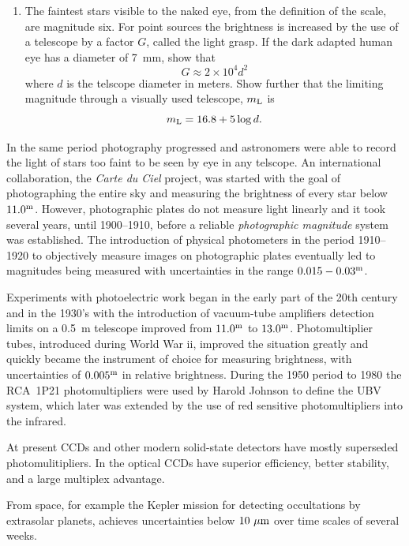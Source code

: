 \begin{enumerate}
\item The faintest stars visible to the naked eye, from the definition
  of the scale, are magnitude six. For point sources the brightness is
  increased by the use of a telescope by a factor $G$, called the
  light grasp. If the dark adapted human eye has a diameter of 7~mm,
  show that 
\[
G\approx 2\times10^4 d^2
\]
where $d$ is the telscope diameter in meters. Show further that the
limiting magnitude through a visually used telescope, $m_{\rm L}$ is 
\[
m_{\rm L}=16.8+5\log d.
\]
\setcounter{count}{\value{enumi}} 
\end{enumerate}

In the same period photography progressed and astronomers were able to
record the light of stars too faint to be seen by eye in any
telscope. An international collaboration, the {\it Carte du Ciel}
project, was started with the goal of photographing the entire sky and
measuring the brightness of every star below $11.0^{\rm m}$. However,
photographic plates do not measure light linearly and it took several
years, until 1900--1910, before a reliable {\it photographic
  magnitude} system was established. The introduction of physical
photometers in the period 1910--1920 to objectively measure images on
photographic plates eventually led to magnitudes being measured with
uncertainties in the range $0.015-0.03^{\rm m}$.

Experiments with photoelectric work began in the early part of the
20th century and in the 1930's with the introduction of vacuum-tube
amplifiers detection limits on a 0.5~m telescope improved from
$11.0^{\rm m}$ to $13.0^{\rm m}$. Photomultiplier tubes, introduced
during World War {\sc ii}, improved the situation greatly and quickly
became the instrument of choice for measuring brightness, with
uncertainties of $0.005^{\rm m}$ in relative brightness. During the
1950 period to 1980 the RCA~1P21 photomultipliers were used by Harold
Johnson to define the UBV system, which later was extended by the use
of red sensitive photomultipliers into the infrared. 

At present CCDs and other modern solid-state detectors have mostly superseded
photomulitipliers. In the optical CCDs have superior efficiency,
better stability, and a large multiplex advantage.

From space, for example the Kepler mission for detecting occultations
by extrasolar planets, achieves uncertainties below $10~\mu{\rm m}$
over time scales of several weeks.

